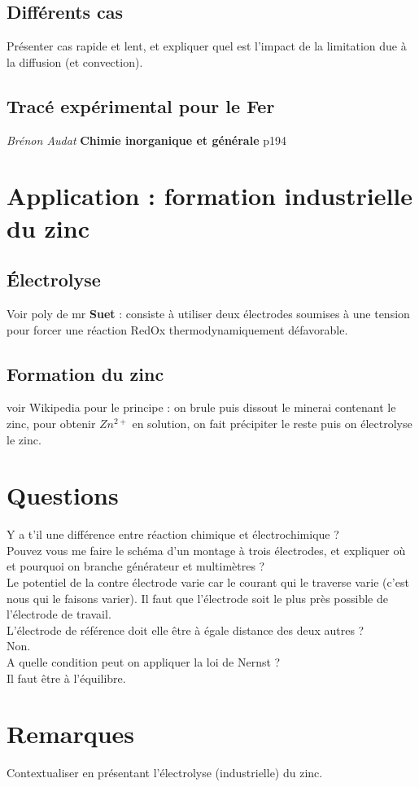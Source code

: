 \documentclass[12pt,prb,aps,epsf]{article}
\begin{document}
\subsection{Différents cas}
Présenter cas rapide et lent, et expliquer quel est l'impact de la limitation due à la diffusion (et convection).

\subsection{Tracé expérimental pour le Fer}
\textit{Brénon Audat} \textbf{Chimie inorganique et générale} p194


\section{Application : formation industrielle du zinc}
\subsection{Électrolyse}
Voir poly de mr \textbf{Suet} : consiste à utiliser deux électrodes soumises à une tension pour forcer une réaction RedOx thermodynamiquement défavorable.

\subsection{Formation du zinc}
voir Wikipedia pour le principe : on brule puis dissout le minerai contenant le zinc, pour obtenir $Zn^{2+}$ en solution, on fait précipiter le reste puis on électrolyse le zinc.

\section*{Questions}
Y a t'il une différence entre réaction chimique et électrochimique ?\\

Pouvez vous me faire le schéma d'un montage à trois électrodes, et expliquer où et pourquoi on branche générateur et multimètres ?\\
Le potentiel de la contre électrode varie car le courant qui le traverse varie (c'est nous qui le faisons varier). Il faut que l'électrode soit le plus près possible de l'électrode de travail.\\

L'électrode de référence doit elle être à égale distance des deux autres ?\\
Non. \\

A quelle condition peut on appliquer la loi de Nernst ?\\
Il faut être à l'équilibre.

\section*{Remarques}
Contextualiser en présentant l'électrolyse (industrielle) du zinc.
\end{document}

